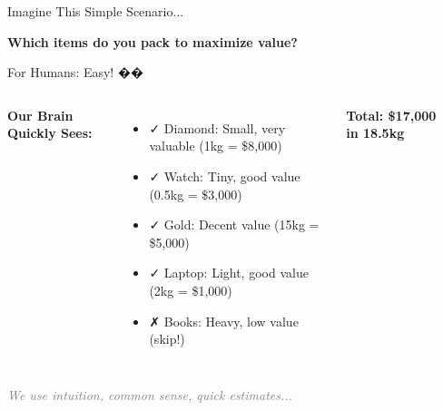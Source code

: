 \documentclass[aspectratio=169]{beamer}
\begin{document}
\begin{frame}{Imagine This Simple Scenario...}
\begin{center}
\end{center}

\vspace{0.5cm}
\begin{center}
\Large \textcolor{aiblue}{\textbf{Which items do you pack to maximize value?}}
\end{center}
\end{frame}

\begin{frame}{For Humans: Easy! ��}
\begin{columns}
\textbf{Our Brain Quickly Sees:}
\begin{itemize}
    \item ✓ Diamond: Small, very valuable (1kg = \$8,000)
    \item ✓ Watch: Tiny, good value (0.5kg = \$3,000)
    \item ✓ Gold: Decent value (15kg = \$5,000)
    \item ✓ Laptop: Light, good value (2kg = \$1,000)
    \item ✗ Books: Heavy, low value (skip!)
\end{itemize}

\vspace{0.3cm}
\textcolor{aigreen}{\textbf{Total: \$17,000 in 18.5kg}}

\begin{center}
\end{center}
\end{columns}

\vspace{0.5cm}
\begin{center}
\textcolor{gray}{\textit{We use intuition, common sense, quick estimates...}}
\end{center}
\end{frame}
\end{document}
